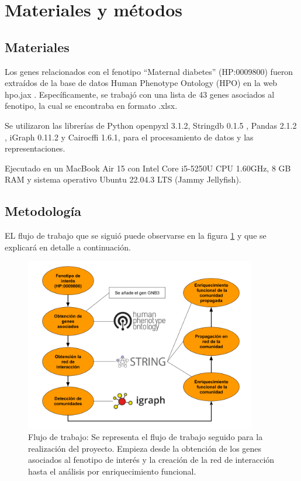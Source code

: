 \section{Materiales y métodos}

\subsection{Materiales}
Los genes relacionados con el fenotipo ``Maternal diabetes'' (HP:0009800) fueron extraídos de la base de datos Human Phenotype Ontology (HPO) en la web hpo.jax \cite{Kohler2017}. Específicamente, se trabajó con una lista de 43 genes asociados al fenotipo, la cual se encontraba en formato .xlsx.

Se utilizaron las librerías de Python
openpyxl 3.1.2, Stringdb 0.1.5 \cite{Mering2005}, Pandas 2.1.2 \cite{McKinney2015}, iGraph 0.11.2 \cite{Csardi2006} y Cairocffi 1.6.1, para el procesamiento de datos y las representaciones.


Ejecutado en un MacBook Air 15 con Intel Core i5-5250U CPU 1.60GHz, 8 GB RAM y sistema operativo Ubuntu 22.04.3 LTS (Jammy Jellyfish).

\subsection{Metodología}

EL flujo de trabajo que se siguió puede observarse en la figura \ref{fig:workflow} y que se explicará en detalle a continuación.

\begin{figure}[h!]
	\includegraphics[width=0.9\textwidth]{figures/workflow.png}
	\caption{Flujo de trabajo: Se representa el flujo de trabajo seguido para la realización del proyecto. Empieza desde la obtención de los genes asociados al fenotipo de interés y la creación de la red de interacción hasta el análisis por enriquecimiento funcional.}
	\label{fig:workflow}
\end{figure}

